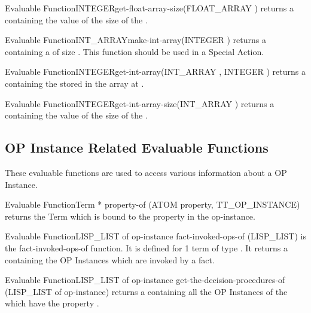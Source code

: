 \begin{typeefa}{Evaluable Function}{INTEGER}{get-float-array-size}{(FLOAT\_ARRAY
)}
returns a  containing the  value of the size of the
. 
\end{typeefa}

\begin{typeefa}{Evaluable Function}{INT\_ARRAY}{make-int-array}{(INTEGER )}
returns a  containing a  of size .
This function should be used in a Special Action.
\end{typeefa}

\begin{typeefa}{Evaluable Function}{INTEGER}{get-int-array}{(INT\_ARRAY
, INTEGER )}
returns a  containing the   stored in the array
 at  . 
\end{typeefa}

\begin{typeefa}{Evaluable Function}{INTEGER}{get-int-array-size}{(INT\_ARRAY
)}
returns a  containing the  value of the size of
the .
\end{typeefa}

\subsection{OP Instance Related Evaluable Functions}

These evaluable functions are used to access various information about a OP Instance.

\begin{typeefa}{Evaluable Function}{Term *} {property-of} {(ATOM property, TT\_OP\_INSTANCE)} 
returns the Term which is bound to the property  in the
op-instance. 
\end{typeefa}

\begin{typeefa}{Evaluable Function}{LISP\_LIST of op-instance} {fact-invoked-ops-of}
{(LISP\_LIST)}  
is the fact-invoked-ops-of function. It is defined for 1 term of type
. It returns a  containing the OP Instances
which are invoked by a fact. 
\end{typeefa}

\begin{typeefa}{Evaluable Function}{LISP\_LIST of op-instance}
{get-the-decision-procedures-of} {(LISP\_LIST of op-instance)} 
returns a  containing all the OP Instances of the
 which have the property  .
\end{typeefa}


